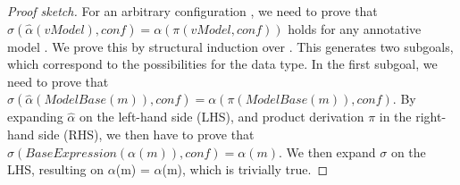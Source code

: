 \begin{proof}[Proof sketch]
 For an arbitrary configuration , we need to prove that 
$\mathit{\sigma(\hat{\alpha}(vModel),conf)} = \mathit{\alpha(\pi(vModel,conf))}$ 
 holds for any annotative model . 
 We prove this by structural induction over . 
 This generates two subgoals, which correspond to the possibilities for the  data type. 
 In the first subgoal, we need to prove that 
 $\mathit{\sigma(\hat{\alpha}(ModelBase(m)),conf)} = \mathit{\alpha(\pi(ModelBase(m)),conf)}$.
 By expanding $\hat\alpha$ on the left-hand side (LHS), and product derivation $\pi$ in the right-hand side (RHS), we then have to prove that 
 $\mathit{\sigma(BaseExpression(\alpha(m)),conf)} = \alpha(m)$.
 We then expand $\sigma$ on the LHS, resulting on 
 $\alpha$(m) = $\alpha$(m),
 which is trivially true. 
 

\end{proof}
